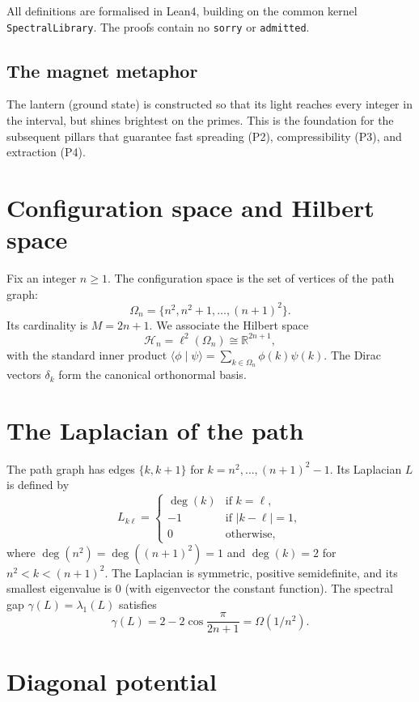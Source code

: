 \documentclass[11pt,a4paper]{article}
\begin{document}
All definitions are formalised in Lean4, building on the common kernel \texttt{SpectralLibrary}. The proofs contain no \texttt{sorry} or \texttt{admitted}.

\subsection{The magnet metaphor}

The lantern (ground state) is constructed so that its light reaches every integer in the interval, but shines brightest on the primes. This is the foundation for the subsequent pillars that guarantee fast spreading (P2), compressibility (P3), and extraction (P4).

\section{Configuration space and Hilbert space}

Fix an integer $n\ge 1$. The configuration space is the set of vertices of the path graph:
\[
\Omega_n = \{n^2, n^2+1, \dots, (n+1)^2\}.
\]
Its cardinality is $M = 2n+1$. We associate the Hilbert space
\[
\mathcal{H}_n = \ell^2(\Omega_n) \cong \mathbb{R}^{2n+1},
\]
with the standard inner product $\langle \phi \mid \psi \rangle = \sum_{k\in\Omega_n} \phi(k)\psi(k)$. The Dirac vectors $\delta_k$ form the canonical orthonormal basis.

\section{The Laplacian of the path}

The path graph has edges $\{k,k+1\}$ for $k = n^2,\dots,(n+1)^2-1$. Its Laplacian $L$ is defined by
\[
L_{k\ell} = \begin{cases}
\deg(k) & \text{if } k=\ell,\\
-1 & \text{if } |k-\ell|=1,\\
0 & \text{otherwise},
\end{cases}
\]
where $\deg(n^2)=\deg((n+1)^2)=1$ and $\deg(k)=2$ for $n^2<k<(n+1)^2$. The Laplacian is symmetric, positive semidefinite, and its smallest eigenvalue is $0$ (with eigenvector the constant function). The spectral gap $\gamma(L) = \lambda_1(L)$ satisfies
\[
\gamma(L) = 2 - 2\cos\frac{\pi}{2n+1} = \Omega(1/n^2).
\]

\section{Diagonal potential}
\end{document}
